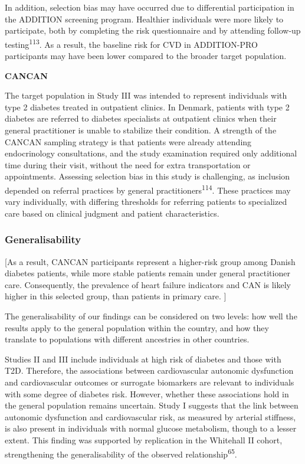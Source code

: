 \documentclass[
  a4paper,
  headsepline=true,
  open=any]{scrbook}
\begin{document}
In addition, selection bias may have occurred due to differential
participation in the ADDITION screening program. Healthier individuals
were more likely to participate, both by completing the risk
questionnaire and by attending follow-up testing\textsuperscript{113}.
As a result, the baseline risk for CVD in ADDITION-PRO participants may
have been lower compared to the broader target population.

\textbf{CANCAN}

The target population in Study III was intended to represent individuals
with type 2 diabetes treated in outpatient clinics. In Denmark, patients
with type 2 diabetes are referred to diabetes specialists at outpatient
clinics when their general practitioner is unable to stabilize their
condition. A strength of the CANCAN sampling strategy is that patients
were already attending endocrinology consultations, and the study
examination required only additional time during their visit, without
the need for extra transportation or appointments. Assessing selection
bias in this study is challenging, as inclusion depended on referral
practices by general practitioners\textsuperscript{114}. These practices
may vary individually, with differing thresholds for referring patients
to specialized care based on clinical judgment and patient
characteristics.

\hypertarget{generalisability}{%
\subsubsection{Generalisability}\label{generalisability}}

{[}As a result, CANCAN participants represent a higher-risk group among
Danish diabetes patients, while more stable patients remain under
general practitioner care. Consequently, the prevalence of heart failure
indicators and CAN is likely higher in this selected group, than
patients in primary care. {]}

The generalisability of our findings can be considered on two levels:
how well the results apply to the general population within the country,
and how they translate to populations with different ancestries in other
countries.

Studies II and III include individuals at high risk of diabetes and
those with T2D. Therefore, the associations between cardiovascular
autonomic dysfunction and cardiovascular outcomes or surrogate
biomarkers are relevant to individuals with some degree of diabetes
risk. However, whether these associations hold in the general population
remains uncertain. Study I suggests that the link between autonomic
dysfunction and cardiovascular risk, as measured by arterial stiffness,
is also present in individuals with normal glucose metabolism, though to
a lesser extent. This finding was supported by replication in the
Whitehall II cohort, strengthening the generalisability of the observed
relationship\textsuperscript{65}.
\end{document}
